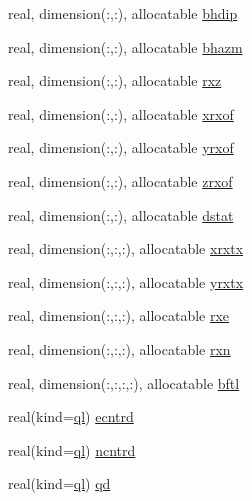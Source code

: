 \begin{DoxyCompactItemize}
real, dimension(\+:,\+:), allocatable \hyperlink{namespacelg__input__routines_ad18dca12a7805ae624b71667a773a294}{bhdip}
\item 
real, dimension(\+:,\+:), allocatable \hyperlink{namespacelg__input__routines_aaddc398e9198a4c9e8eb40573a3f4347}{bhazm}
\item 
real, dimension(\+:,\+:), allocatable \hyperlink{namespacelg__input__routines_a49a8e3b29c968fef1668037824d295f4}{rxz}
\item 
real, dimension(\+:,\+:), allocatable \hyperlink{namespacelg__input__routines_afa609399ab44664f964450ac0c0212a3}{xrxof}
\item 
real, dimension(\+:,\+:), allocatable \hyperlink{namespacelg__input__routines_afb1d371ae725f99f0c1de7b0f5ee4f9f}{yrxof}
\item 
real, dimension(\+:,\+:), allocatable \hyperlink{namespacelg__input__routines_aa4d0d65baa1effb088dd0a2a1bcd2185}{zrxof}
\item 
real, dimension(\+:,\+:), allocatable \hyperlink{namespacelg__input__routines_a0ad3fab990ff61df0aef4ca7bb41cf23}{dstat}
\item 
real, dimension(\+:,\+:,\+:), allocatable \hyperlink{namespacelg__input__routines_a9d8ccd1fc7c88ab57fa5af75b36600f1}{xrxtx}
\item 
real, dimension(\+:,\+:,\+:), allocatable \hyperlink{namespacelg__input__routines_ae8e2697ce00581c54a3a6cffceef745b}{yrxtx}
\item 
real, dimension(\+:,\+:,\+:), allocatable \hyperlink{namespacelg__input__routines_ab5e3409ae1c1d7f9b1d0ab31c0dfa296}{rxe}
\item 
real, dimension(\+:,\+:,\+:), allocatable \hyperlink{namespacelg__input__routines_af724dc158a78913ba807173a41c49e7d}{rxn}
\item 
real, dimension(\+:,\+:,\+:,\+:), allocatable \hyperlink{namespacelg__input__routines_ac7f5afd80317e5c4f20d0f68bac9cf59}{bftl}
\item 
real(kind=\hyperlink{namespacelg__input__routines_a8c3fd17aa03dd450ed3e242df939ad01}{ql}) \hyperlink{namespacelg__input__routines_a324ba9df6f9ed5b8c67035350579f985}{ecntrd}
\item 
real(kind=\hyperlink{namespacelg__input__routines_a8c3fd17aa03dd450ed3e242df939ad01}{ql}) \hyperlink{namespacelg__input__routines_afe3e4dc2c250144c91fdb508ecc23861}{ncntrd}
\item 
real(kind=\hyperlink{namespacelg__input__routines_a8c3fd17aa03dd450ed3e242df939ad01}{ql}) \hyperlink{namespacelg__input__routines_a171b7d03fe9858fea1233f4815ae16ed}{qd}

\end{DoxyCompactItemize}
